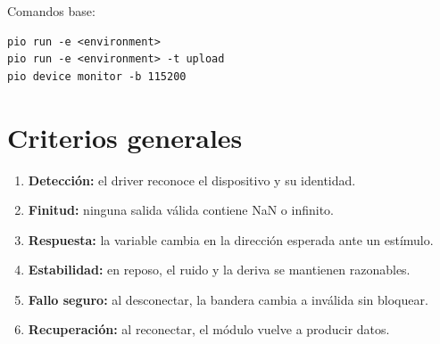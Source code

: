 \documentclass[11pt,a4paper,oneside]{report}
\begin{document}
Comandos base:
\begin{lstlisting}
pio run -e <environment>
pio run -e <environment> -t upload
pio device monitor -b 115200
\end{lstlisting}

\section{Criterios generales}
\begin{enumerate}
  \item \textbf{Detección:} el driver reconoce el dispositivo y su identidad.
  \item \textbf{Finitud:} ninguna salida válida contiene NaN o infinito.
  \item \textbf{Respuesta:} la variable cambia en la dirección esperada ante un estímulo.
  \item \textbf{Estabilidad:} en reposo, el ruido y la deriva se mantienen razonables.
  \item \textbf{Fallo seguro:} al desconectar, la bandera cambia a inválida sin bloquear.
  \item \textbf{Recuperación:} al reconectar, el módulo vuelve a producir datos.
\end{enumerate}
\end{document}

